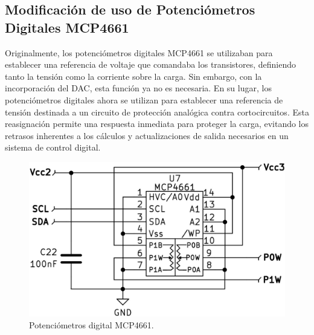 \subsection{Modificación de uso de Potenciómetros Digitales MCP4661}
Originalmente, los potenciómetros digitales MCP4661 se utilizaban para establecer una referencia de voltaje que comandaba los transistores, definiendo tanto la tensión como la corriente sobre la carga. Sin embargo, con la incorporación del DAC, esta función ya no es necesaria. En su lugar, los potenciómetros digitales ahora se utilizan para establecer una referencia de tensión destinada a un circuito de protección analógica contra cortocircuitos. Esta reasignación permite una respuesta inmediata para proteger la carga, evitando los retrasos inherentes a los cálculos y actualizaciones de salida necesarios en un sistema de control digital.
\begin{figure}[H]
    \centering
    \includegraphics[scale=0.2]{./imagenes/potenciometro_digital.jpg}
    \caption{Potenciómetros digital MCP4661.}
    \label{F:potenciometro_digital}
\end{figure}

